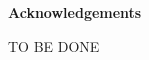 \bigskip
\bigskip

\pagebreak\par
{\Large\noindent \textbf{Acknowledgements}}\\

\bigskip
\bigskip


TO BE DONE


\pagebreak
